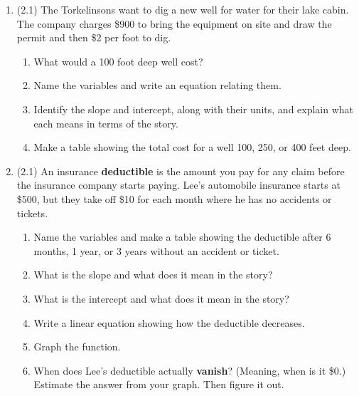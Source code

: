 \documentclass[12pt]{article}
\begin{document}
\begin{enumerate}
 \item (2.1) The Torkelinsons want to dig a new well for water for their lake cabin.  The company charges \$900 to bring the equipment on site and draw the permit and then \$2 per foot to dig.
\begin{enumerate}
\item What would a 100 foot deep well cost?
\item Name the variables and write an equation relating them.
\item Identify the slope and intercept, along with their units, and explain what each means in terms of the story. 
\item Make a table showing the total cost for a well 100, 250, or 400 feet deep.
\end{enumerate} %

\item (2.1) An insurance \textbf{deductible} is the amount you pay for any claim before the insurance company starts paying.  Lee's automobile insurance starts at \$500, but they take off \$10 for each month where he has no accidents or tickets.
\begin{enumerate}
\item Name the variables and make a table showing the deductible after 6 months, 1 year, or 3 years without an accident or ticket.
\item What is the slope and what does it mean in the story?
\item What is the intercept and what does it mean in the story?
\item Write a linear equation showing how the deductible decreases.
\item Graph the function.
\item When does Lee's deductible actually \textbf{vanish}? (Meaning, when is it \$0.) Estimate the answer from your graph.  Then figure it out.
\end{enumerate} 


\end{enumerate}
\end{document}
